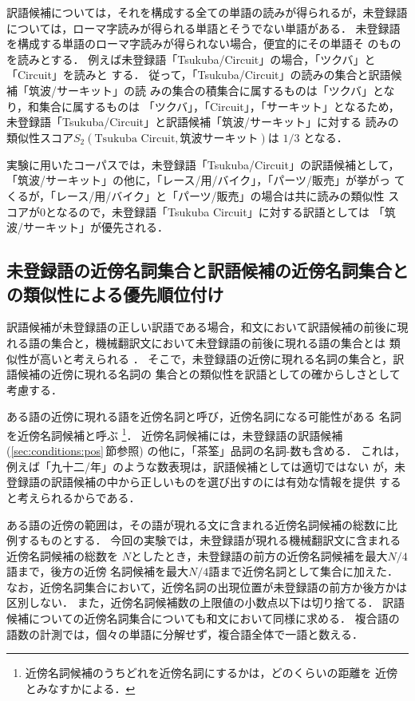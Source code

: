 訳語候補については，それを構成する全ての単語の読みが得られるが，未登録語
については，ローマ字読みが得られる単語とそうでない単語がある． 
未登録語を構成する単語のローマ字読みが得られない場合，便宜的にその単語そ
のものを読みとする．
例えば未登録語「Tsukuba/Circuit」の場合，「ツクバ」と「Circuit」を読みと
する．
従って，「Tsukuba/Circuit」の読みの集合と訳語候補「筑波/サーキット」の読
みの集合の積集合に属するものは「ツクバ」となり，和集合に属するものは
「ツクバ」，「Circuit」，「サーキット」となるため，
未登録語「Tsukuba/Circuit」と訳語候補「筑波/サーキット」に対する
読みの類似性スコア$S_2(\mbox{Tsukuba Circuit},筑波サーキット)$は $1/3$
となる．

実験に用いたコーパスでは，未登録語「Tsukuba/Circuit」の訳語候補として，
「筑波/サーキット」の他に，「レース/用/バイク」，「パーツ/販売」が挙がっ 
てくるが，「レース/用/バイク」と「パーツ/販売」の場合は共に読みの類似性
スコアが0となるので，未登録語「Tsukuba Circuit」に対する訳語としては
「筑波/サーキット」が優先される．


\subsection{未登録語の近傍名詞集合と訳語候補の近傍名詞集合との類似性による優先順位付け}
\label{sec:conditions:neighbor}

訳語候補が未登録語の正しい訳語である場合，和文において訳語候補の前後に現
れる語の集合と，機械翻訳文において未登録語の前後に現れる語の集合とは
類似性が高いと考えられる
\cite{Fung98,Kaji01}．
そこで，未登録語の近傍に現れる名詞の集合と，訳語候補の近傍に現れる名詞の
集合との類似性を訳語としての確からしさとして考慮する． 

ある語の近傍に現れる語を近傍名詞と呼び，近傍名詞になる可能性がある
名詞を近傍名詞候補と呼ぶ
\footnote{近傍名詞候補のうちどれを近傍名詞にするかは，どのくらいの距離を
近傍とみなすかによる．}．
近傍名詞候補には，未登録語の訳語候補(\ref{sec:conditions:pos}\,節参照)
の他に，「茶筌」品詞の名詞-数も含める．
これは，例えば「九十二/年」のような数表現は，訳語候補としては適切ではない
が，未登録語の訳語候補の中から正しいものを選び出すのには有効な情報を提供
すると考えられるからである． 

ある語の近傍の範囲は，その語が現れる文に含まれる近傍名詞候補の総数に比
例するものとする．
今回の実験では，未登録語が現れる機械翻訳文に含まれる近傍名詞候補の総数を
$N$としたとき，未登録語の前方の近傍名詞候補を最大$N/4$語まで，後方の近傍
名詞候補を最大$N/4$語まで近傍名詞として集合に加えた．
なお，近傍名詞集合において，近傍名詞の出現位置が未登録語の前方か後方かは
区別しない．
また，近傍名詞候補数の上限値の小数点以下は切り捨てる．
訳語候補についての近傍名詞集合についても和文において同様に求める．
複合語の語数の計測では，個々の単語に分解せず，複合語全体で一語と数える．


